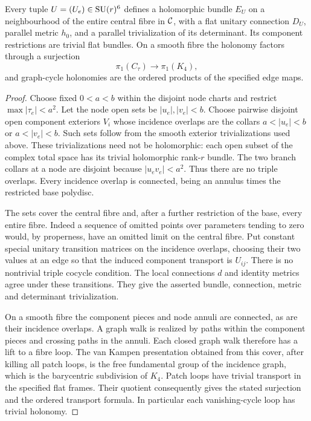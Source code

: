 \begin{proposition}\label{prop:bundle}
Every tuple $U=(U_e)\in\operatorname{SU}(r)^6$ defines a holomorphic bundle
$E_U$ on a neighbourhood of the entire central fibre in $\mathcal C$,
with a flat unitary connection $D_U$, parallel metric $h_0$,
and a parallel trivialization of its determinant. Its component
restrictions are trivial flat bundles. On a smooth fibre the
holonomy factors through a surjection
\[
 \pi_1(C_\tau)\longrightarrow\pi_1(K_4),
\]
and graph-cycle holonomies are the ordered products of the
specified edge maps.
\end{proposition}
\begin{proof}
Choose fixed $0<a<b$ within the disjoint node charts and
restrict $\max|\tau_e|<a^2$. Let the node open sets be
$|u_e|,|v_e|<b$. Choose pairwise disjoint open component
exteriors $V_i$ whose incidence overlaps are the collars
$a<|u_e|<b$ or $a<|v_e|<b$. Such sets follow from the smooth
exterior trivializations used above. These trivializations
need not be holomorphic: each open subset of the complex
total space has its trivial holomorphic rank-$r$ bundle.
The two branch collars at a node are disjoint because
$|u_ev_e|<a^2$. Thus there are no triple overlaps. Every
incidence overlap is connected, being an annulus times
the restricted base polydisc.

The sets cover the central fibre and, after a further
restriction of the base, every entire fibre. Indeed a
sequence of omitted points over parameters tending to zero
would, by properness, have an omitted limit on the central
fibre. Put constant special unitary transition matrices on
the incidence overlaps, choosing their two values at an
edge so that the induced component transport is $U_{ij}$.
There is no nontrivial triple cocycle condition. The local
connections $d$ and identity metrics agree under these
transitions. They give the asserted bundle, connection,
metric and determinant trivialization.

On a smooth fibre the component pieces and node annuli are
connected, as are their incidence overlaps. A graph walk
is realized by paths within the component pieces and
crossing paths in the annuli. Each closed graph walk
therefore has a lift to a fibre loop. The van Kampen
presentation obtained from this cover, after killing all
patch loops, is the free fundamental group of the
incidence graph, which is the barycentric subdivision of
$K_4$. Patch loops have trivial transport in the specified
flat frames. Their quotient consequently gives the stated
surjection and the ordered transport formula. In particular
each vanishing-cycle loop has trivial holonomy.
\end{proof}

